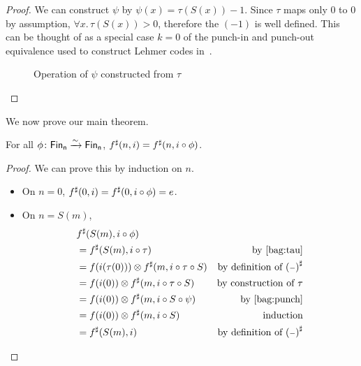 \begin{proof}
We can construct $\psi$ by $\psi(x) = \tau(S(x)) - 1$.
Since $\tau$ maps only 0 to 0 by assumption, $\forall x. \, \tau(S(x)) > 0$, therefore
the $(- 1)$ is well defined. This can be thought of as a special case $k = 0$ of the punch-in and punch-out
equivalence used to construct Lehmer codes in~\cite{choudhurySymmetriesReversibleProgramming2022}.

\begin{figure}[H]
    \centering
    \hspace{1em}
    \caption{Operation of $\psi$ constructed from $\tau$}
    \label{fig:enter-label}
\end{figure}
\end{proof}


We now prove our main theorem.

\begin{theorem}\label{bag:perm-sat}
For all $\phi\colon \Fin[n]\xto{\sim}\Fin[n]$, $\ext{f}(n, i) \id \ext{f}(n, i \circ \phi)$.
\end{theorem}

\begin{proof}
We can prove this by induction on $n$.
\begin{itemize}
    \item On $n = 0$, $\ext{f}(0, i) \id \ext{f}(0, i \circ \phi) = e$.
    \item On $n = S(m)$,
        \begin{align*}
        & \ext{f}(S(m), i \circ \phi) \\
        & = \ext{f}(S(m), i \circ \tau) & \text{by~\cref{bag:tau}} \\
        & = f(i(\tau(0))) \otimes \ext{f}(m, i \circ \tau \circ S) & \text{by definition of $\ext{(\blank)}$} \\
        & = f(i(0)) \otimes \ext{f}(m, i \circ \tau \circ S) & \text{by construction of $\tau$} \\
        & = f(i(0)) \otimes \ext{f}(m, i \circ S \circ \psi) &\text{by~\cref{bag:punch}} \\
        & = f(i(0)) \otimes \ext{f}(m, i \circ S) & \text{induction} \\
        & = \ext{f}(S(m), i) & \text{by definition of $\ext{(\blank)}$}
        \end{align*}
\end{itemize}
\end{proof}


